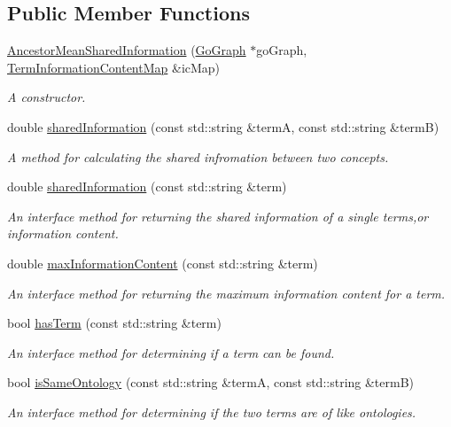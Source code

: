 \subsection*{Public Member Functions}
\begin{DoxyCompactItemize}
\item 
\hyperlink{classAncestorMeanSharedInformation_aef781d2b6461b28b4974aa990611c8a1}{Ancestor\+Mean\+Shared\+Information} (\hyperlink{classGoGraph}{Go\+Graph} $\ast$go\+Graph, \hyperlink{classTermInformationContentMap}{Term\+Information\+Content\+Map} \&ic\+Map)
\begin{DoxyCompactList}\small\item\em A constructor. \end{DoxyCompactList}\item 
double \hyperlink{classAncestorMeanSharedInformation_a86dad7b02ff45ae758a2b311ad763350}{shared\+Information} (const std\+::string \&termA, const std\+::string \&termB)
\begin{DoxyCompactList}\small\item\em A method for calculating the shared infromation between two concepts. \end{DoxyCompactList}\item 
double \hyperlink{classAncestorMeanSharedInformation_af31937c58ee53db666586b446bc23061}{shared\+Information} (const std\+::string \&term)
\begin{DoxyCompactList}\small\item\em An interface method for returning the shared information of a single terms,or information content. \end{DoxyCompactList}\item 
double \hyperlink{classAncestorMeanSharedInformation_abf7d613e1459a5cf49071871e55f8a50}{max\+Information\+Content} (const std\+::string \&term)
\begin{DoxyCompactList}\small\item\em An interface method for returning the maximum information content for a term. \end{DoxyCompactList}\item 
bool \hyperlink{classAncestorMeanSharedInformation_af7503d6f761957bcb22d0e6614d87fa4}{has\+Term} (const std\+::string \&term)
\begin{DoxyCompactList}\small\item\em An interface method for determining if a term can be found. \end{DoxyCompactList}\item 
bool \hyperlink{classAncestorMeanSharedInformation_a75f59ac9d53014b967d0a81de8a07dbb}{is\+Same\+Ontology} (const std\+::string \&termA, const std\+::string \&termB)
\begin{DoxyCompactList}\small\item\em An interface method for determining if the two terms are of like ontologies. \end{DoxyCompactList}\end{DoxyCompactItemize}


